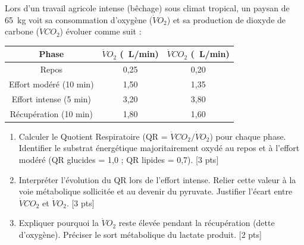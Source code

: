 \documentclass[11pt]{article}
\begin{document}
\begin{exercice}
Lors d'un travail agricole intense (bêchage) sous climat tropical, un paysan de \SI{65}{kg} voit sa consommation d'oxygène ($\dot{V}O_2$) et sa production de dioxyde de carbone ($\dot{V}CO_2$) évoluer comme suit :
\begin{center}
\begin{tabular}{|c|c|c|}
\hline
\textbf{Phase} & $\dot{V}O_2$ (\SI{}{L/min}) & $\dot{V}CO_2$ (\SI{}{L/min}) \\ \hline
Repos & 0,25 & 0,20 \\ \hline
Effort modéré (10 min) & 1,50 & 1,35 \\ \hline
Effort intense (5 min) & 3,20 & 3,80 \\ \hline
Récupération (10 min) & 1,80 & 1,60 \\ \hline
\end{tabular}
\end{center}
\begin{enumerate}
    \item Calculer le Quotient Respiratoire (QR = $\dot{V}CO_2 / \dot{V}O_2$) pour chaque phase. Identifier le substrat énergétique majoritairement oxydé au repos et à l'effort modéré (QR glucides = 1,0 ; QR lipides = 0,7). [3 pts]
    \item Interpréter l'évolution du QR lors de l'effort intense. Relier cette valeur à la voie métabolique sollicitée et au devenir du pyruvate. Justifier l'écart entre $\dot{V}CO_2$ et $\dot{V}O_2$. [3 pts]
    \item Expliquer pourquoi la $\dot{V}O_2$ reste élevée pendant la récupération (dette d'oxygène). Préciser le sort métabolique du lactate produit. [2 pts]
\end{enumerate}
\end{exercice}
\end{document}
